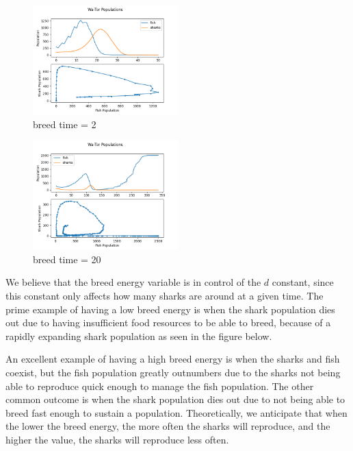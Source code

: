 \documentclass[12pt]{iopart} %
\begin{document}
\begin{figure}[h!tbp]
  \begin{center}
  \item[]\includegraphics[width=0.5\textwidth]{figure21.png}
  \caption{\label{fig:figure21}
  breed time = 2
  }
  \end{center}
\end{figure}

\begin{figure}[h!tbp]
  \begin{center}
  \item[]\includegraphics[width=0.5\textwidth]{figure22.png}
  \caption{\label{fig:figure22}
  breed time = 20
  }
  \end{center}
\end{figure}

We believe that the breed energy variable is in control of the $d$ constant, since this constant only affects how many sharks are around at a given time. 
The prime example of having a low breed energy is when the shark population dies out due to having insufficient food resources to be able to breed, because of a rapidly expanding shark population as seen in the figure below.

An excellent example of having a high breed energy is when the sharks and fish coexist, but the fish population greatly outnumbers due to the sharks not being able to reproduce quick enough to manage the fish population. 
The other common outcome is when the shark population dies out due to not being able to breed fast enough to sustain a population. 
Theoretically, we anticipate that when the lower the breed energy, the more often the sharks will reproduce, and the higher the value, the sharks will reproduce less often.
\end{document}
